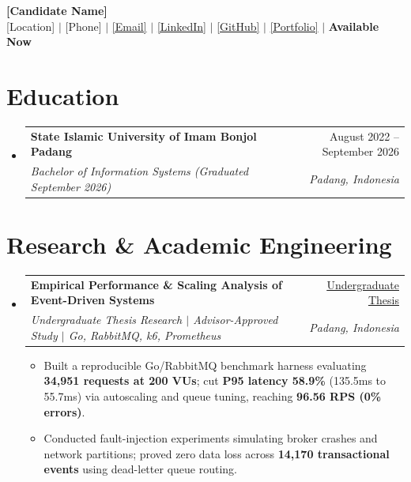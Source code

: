 \documentclass[letterpaper,11pt]{article}
\makeatletter
\newcommand{\resumeItem}[1]{
  \item\small{
    {#1 \vspace{-2pt}}
  }
}
\newcommand{\resumeSubheading}[4]{
  \vspace{-2.5pt}\item
    \begin{tabular*}{0.97\textwidth}[t]{l@{\extracolsep{\fill}}r}
      \textbf{#1} & #2 \\
      \textit{\small#3} & \textit{\small #4} \\
    \end{tabular*}\vspace{-5.5pt}
}
\newcommand{\resumeSubHeadingListStart}{\begin{itemize}[leftmargin=0.15in, label={}, itemsep=0pt]}
\newcommand{\resumeSubHeadingListEnd}{\end{itemize}\vspace{-8.5pt}}
\newcommand{\resumeItemListStart}{\begin{itemize}[noitemsep, topsep=0pt]}
\newcommand{\resumeItemListEnd}{\end{itemize}\vspace{-4.0pt}}
\makeatother
\begin{document}
\begin{center}
    {\Huge \bfseries [Candidate Name]} \\ \vspace{1pt}
    \footnotesize [Location] $|$ [Phone] $|$ \href{mailto:email@example.com}{[Email]} $|$ \href{https://linkedin.com}{[LinkedIn]} $|$ \href{https://github.com}{[GitHub]} $|$ \href{https://example.com}{[Portfolio]} $|$ \textbf{Available Now}
\end{center}\vspace{-6pt}

\section{Education}
  \resumeSubHeadingListStart
    \resumeSubheading
      {State Islamic University of Imam Bonjol Padang}{August 2022 -- September 2026}
      {Bachelor of Information Systems (Graduated September 2026)}{Padang, Indonesia}
  \resumeSubHeadingListEnd

\section{Research \& Academic Engineering}
  \resumeSubHeadingListStart
    \resumeSubheading
      {Empirical Performance \& Scaling Analysis of Event-Driven Systems}{\href{https://repository.uinib.ac.id/34986/}{\underline{Undergraduate Thesis}}}
      {Undergraduate Thesis Research $|$ Advisor-Approved Study $|$ Go, RabbitMQ, k6, Prometheus}{Padang, Indonesia}
      \resumeItemListStart
        \resumeItem{Built a reproducible Go/RabbitMQ benchmark harness evaluating \textbf{34,951 requests at 200 VUs}; cut \textbf{P95 latency 58.9\%} (135.5ms to 55.7ms) via autoscaling and queue tuning, reaching \textbf{96.56 RPS (0\% errors)}.}
        \resumeItem{Conducted fault-injection experiments simulating broker crashes and network partitions; proved zero data loss across \textbf{14,170 transactional events} using dead-letter queue routing.}
      \resumeItemListEnd
  \resumeSubHeadingListEnd

\end{document}
